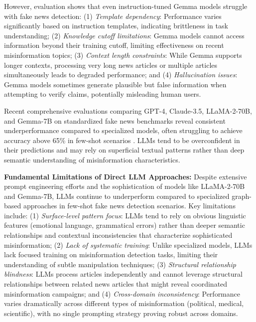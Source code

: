 However, evaluation shows that even instruction-tuned Gemma models struggle with fake news detection: (1) \emph{Template dependency}: Performance varies significantly based on instruction templates, indicating brittleness in task understanding; (2) \emph{Knowledge cutoff limitations}: Gemma models cannot access information beyond their training cutoff, limiting effectiveness on recent misinformation topics; (3) \emph{Context length constraints}: While Gemma supports longer contexts, processing very long news articles or multiple articles simultaneously leads to degraded performance; and (4) \emph{Hallucination issues}: Gemma models sometimes generate plausible but false information when attempting to verify claims, potentially misleading human users.

Recent comprehensive evaluations comparing GPT-4, Claude-3.5, LLaMA-2-70B, and Gemma-7B on standardized fake news benchmarks reveal consistent underperformance compared to specialized models, often struggling to achieve accuracy above 65\% in few-shot scenarios \cite{huang2023chatgpt, zhang2023can}. LLMs tend to be overconfident in their predictions and may rely on superficial textual patterns rather than deep semantic understanding of misinformation characteristics.


\textbf{Fundamental Limitations of Direct LLM Approaches:} Despite extensive prompt engineering efforts and the sophistication of models like LLaMA-2-70B and Gemma-7B, LLMs continue to underperform compared to specialized graph-based approaches in few-shot fake news detection scenarios. Key limitations include: (1) \emph{Surface-level pattern focus}: LLMs tend to rely on obvious linguistic features (emotional language, grammatical errors) rather than deeper semantic relationships and contextual inconsistencies that characterize sophisticated misinformation; (2) \emph{Lack of systematic training}: Unlike specialized models, LLMs lack focused training on misinformation detection tasks, limiting their understanding of subtle manipulation techniques; (3) \emph{Structural relationship blindness}: LLMs process articles independently and cannot leverage structural relationships between related news articles that might reveal coordinated misinformation campaigns; and (4) \emph{Cross-domain inconsistency}: Performance varies dramatically across different types of misinformation (political, medical, scientific), with no single prompting strategy proving robust across domains.

